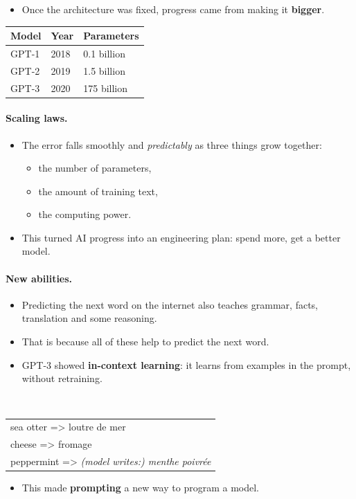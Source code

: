 \documentclass[12pt, a4paper]{article}
\begin{document}
\begin{itemize}
  \item Once the architecture was fixed, progress came from making it
        \textbf{bigger}.
\end{itemize}

\begin{center}
  \renewcommand{\arraystretch}{1.35}
  \begin{tabular}{lll}
    \toprule
    Model & Year & Parameters  \\
    \midrule
    GPT-1 & 2018 & 0.1 billion \\
    GPT-2 & 2019 & 1.5 billion \\
    GPT-3 & 2020 & 175 billion \\
    \bottomrule
  \end{tabular}
\end{center}

\paragraph{Scaling laws.}
\begin{itemize}
  \item The error falls smoothly and \emph{predictably} as three things grow
        together:
        \begin{itemize}
          \item the number of parameters,
          \item the amount of training text,
          \item the computing power.
        \end{itemize}
  \item This turned AI progress into an engineering plan: spend more, get a
        better model.
\end{itemize}

\paragraph{New abilities.}
\begin{itemize}
  \item Predicting the next word on the internet also teaches grammar, facts,
        translation and some reasoning.
  \item That is because all of these help to predict the next word.
  \item GPT-3 showed \textbf{in-context learning}: it learns from examples in
        the prompt, without retraining.
\end{itemize}
\begin{center}
  \tt\small
  \begin{tabular}{l}
    sea otter => loutre de mer \\
    cheese => fromage          \\
    peppermint => \textcolor{orange!80!black}{\textit{(model writes:) menthe poivr\'ee}}
  \end{tabular}
\end{center}
\begin{itemize}
  \item This made \textbf{prompting} a new way to program a model.
\end{itemize}
\end{document}
